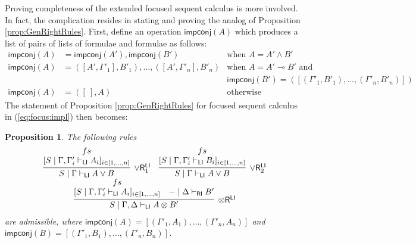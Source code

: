 \documentclass[submission,copyright,creativecommons]{eptcs}
\newtheorem{proposition}[theorem]{Proposition}
\theoremstyle{definition}
\newcommand{\tr}{\otimes \mathsf{R}}
\newcommand{\orrone}{\lor \mathsf{R}_{1}}
\newcommand{\orrtwo}{\lor \mathsf{R}_{2}}
\newcommand{\ot}{\otimes}
\newcommand{\lolli}{\multimap}
\newcommand{\RI}{\mathsf{RI}}
\newcommand{\LI}{\mathsf{LI}}
\newcommand{\impconj}[1]{\mathsf{impconj} (#1)}
\newcommand{\proofbox}[1]{\begin{tabular}{l} #1 \end{tabular}}
\newcommand\niccolo[1]{\mbox{}
{\marginpar{\color{red}NV}}
{\sf\noindent\color{red}#1}}%
\begin{document}



Proving completeness of the extended focused sequent calculus is more involved. In fact, the complication resides in stating and proving the analog of Proposition \ref{prop:GenRightRules}. First, define an operation $\mathsf{impconj}(A)$ which produces a list of pairs of lists of formulae and formulae as follows: 
\begin{displaymath}
  \begin{array}{rll}
    \impconj{A} &= \impconj{A'} , \impconj{B'} &\text{when } A = A' \land B'
    \\
    \impconj{A} &= ([A' , \Gamma'_1] , B'_1) , \dots , ([A' , \Gamma'_n] , B'_n) &\text{when } A = A' \lolli B' \text{ and}
    \\
    & &\impconj{B'} = ([(\Gamma'_1 , B'_1) , \dots , (\Gamma'_n , B'_n)])
    \\
    \impconj{A} &= ([\ ] , A) &\text{otherwise}
  \end{array}
\end{displaymath}
The statement of Proposition \ref{prop:GenRightRules} for focused sequent calculus in (\ref{eq:focus:impl}) then becomes:
\begin{proposition}\label{prop:GenRightRules:impl}
  The following rules
  \begin{displaymath}
    \begin{array}{c}
      \infer[\orrone^{\LI}]{S \mid \Gamma \vdash_{\LI} A \lor B}{
        \deduce{[S \mid \Gamma , \Gamma'_i \vdash_{\LI} A_i]_{i \in [1 , \dots , n]}}{fs}
      }
      \quad
      \infer[\orrtwo^{\LI}]{S \mid \Gamma \vdash_{\LI} A \lor B}{
        \deduce{[S \mid \Gamma , \Gamma'_i \vdash_{\LI} B_i]_{i \in [1 , \dots , n]}}{fs}
      }
      \\
      \infer[\tr^{\LI}]{S \mid \Gamma , \Delta \vdash_{\LI} A \ot B'}{
        \deduce{[S \mid \Gamma , \Gamma'_i \vdash_{\LI} A_i]_{i \in [1 , \dots , n]}}{fs}
        &
        - \mid \Delta \vdash_{\RI} B'
      }
    \end{array}
  \end{displaymath}
  are admissible, where
  $\impconj{A} = [(\Gamma'_1 , A_1) , \dots , (\Gamma'_n , A_n)]$ and $\impconj{B} = [(\Gamma'_1 , B_1) , \dots , (\Gamma'_n , B_n)]$.
\end{proposition}
\end{document}
